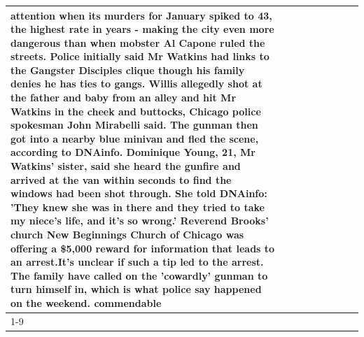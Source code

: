 \begin{table}[H]
\begin{tabular}{lllrlllll}
attention when its murders for January spiked to 43, the highest rate in years - making the city even more dangerous than when mobster Al Capone ruled the streets. Police initially said Mr Watkins had links to the Gangster Disciples clique though his family denies he has ties to gangs. Willis allegedly shot at the father and baby from an alley and hit Mr Watkins in the cheek and buttocks, Chicago police spokesman John Mirabelli said. The gunman then got into a nearby blue minivan and fled the scene, according to DNAinfo. Dominique Young, 21, Mr Watkins' sister, said she heard the gunfire and arrived at the van within seconds to find the windows had been shot through. She told DNAinfo: 'They knew she was in there and they tried to take my niece's life, and it's so wrong.' Reverend Brooks' church New Beginnings Church of Chicago was offering a \$5,000 reward for information that leads to an arrest.It's unclear if such a tip led to the arrest. The family have called on the 'cowardly' gunman to turn himself in, which is what police say happened on the weekend. commendable \\
\cline{1-9}

\end{tabular}
\end{table}
